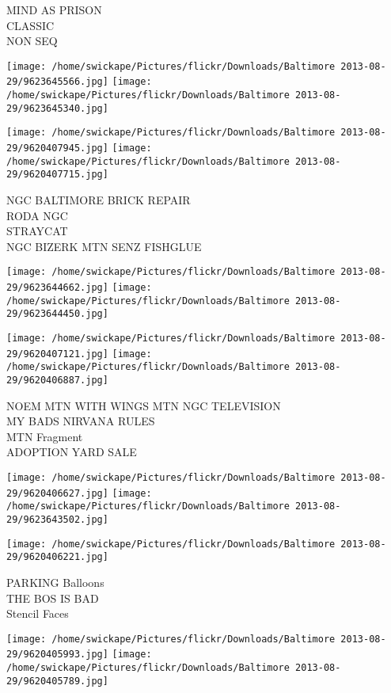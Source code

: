 \documentclass[10pt,letterpaper]{article}
\begin{document}
MIND AS PRISON\\
CLASSIC\\
NON SEQ
\pagebreak

\texttt{[image: /home/swickape/Pictures/flickr/Downloads/Baltimore 2013-08-29/9623645566.jpg]}
\texttt{[image: /home/swickape/Pictures/flickr/Downloads/Baltimore 2013-08-29/9623645340.jpg]}

\texttt{[image: /home/swickape/Pictures/flickr/Downloads/Baltimore 2013-08-29/9620407945.jpg]}
\texttt{[image: /home/swickape/Pictures/flickr/Downloads/Baltimore 2013-08-29/9620407715.jpg]}

NGC BALTIMORE BRICK REPAIR\\
RODA NGC\\
STRAYCAT\\
NGC BIZERK MTN SENZ FISHGLUE
\pagebreak

\texttt{[image: /home/swickape/Pictures/flickr/Downloads/Baltimore 2013-08-29/9623644662.jpg]}
\texttt{[image: /home/swickape/Pictures/flickr/Downloads/Baltimore 2013-08-29/9623644450.jpg]}

\texttt{[image: /home/swickape/Pictures/flickr/Downloads/Baltimore 2013-08-29/9620407121.jpg]}
\texttt{[image: /home/swickape/Pictures/flickr/Downloads/Baltimore 2013-08-29/9620406887.jpg]}

NOEM MTN WITH WINGS MTN NGC TELEVISION\\
MY BADS NIRVANA RULES\\
MTN Fragment\\
ADOPTION YARD SALE
\pagebreak

\texttt{[image: /home/swickape/Pictures/flickr/Downloads/Baltimore 2013-08-29/9620406627.jpg]}
\texttt{[image: /home/swickape/Pictures/flickr/Downloads/Baltimore 2013-08-29/9623643502.jpg]}

\vspace{0.25in}
\texttt{[image: /home/swickape/Pictures/flickr/Downloads/Baltimore 2013-08-29/9620406221.jpg]}

PARKING Balloons\\
THE BOS IS BAD\\
Stencil Faces
\pagebreak

\texttt{[image: /home/swickape/Pictures/flickr/Downloads/Baltimore 2013-08-29/9620405993.jpg]}
\texttt{[image: /home/swickape/Pictures/flickr/Downloads/Baltimore 2013-08-29/9620405789.jpg]}
\end{document}
